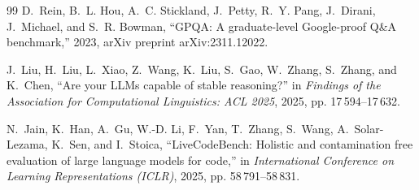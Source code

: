 \documentclass[lettersize,journal]{IEEEtran}
\begin{document}
\begin{thebibliography}{99}
D.~Rein, B.~L. Hou, A.~C. Stickland, J.~Petty, R.~Y. Pang, J.~Dirani, J.~Michael, and S.~R. Bowman, ``{GPQA}: A graduate-level {Google}-proof {Q\&A} benchmark,'' 2023, arXiv preprint arXiv:2311.12022.

J.~Liu, H.~Liu, L.~Xiao, Z.~Wang, K.~Liu, S.~Gao, W.~Zhang, S.~Zhang, and K.~Chen, ``Are your {LLMs} capable of stable reasoning?'' in \emph{Findings of the Association for Computational Linguistics: ACL 2025}, 2025, pp. 17\,594--17\,632.

N.~Jain, K.~Han, A.~Gu, W.-D. Li, F.~Yan, T.~Zhang, S.~Wang, A.~Solar-Lezama, K.~Sen, and I.~Stoica, ``{LiveCodeBench}: Holistic and contamination free evaluation of large language models for code,'' in \emph{International Conference on Learning Representations (ICLR)}, 2025, pp. 58\,791--58\,831.

\end{thebibliography}
\end{document}
